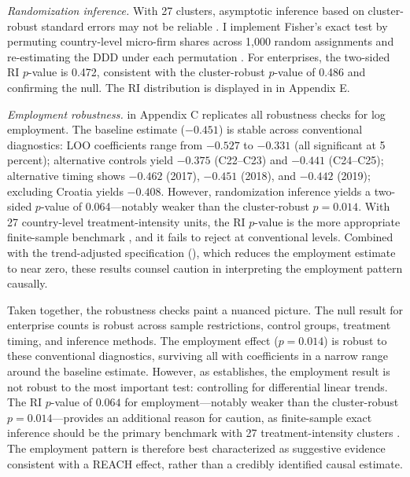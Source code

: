 \documentclass[12pt]{article}
\begin{document}
\textit{Randomization inference.} With 27 clusters, asymptotic inference based on cluster-robust standard errors may not be reliable \citep{bertrand2004, mackinnon2017wild}. I implement Fisher's exact test by permuting country-level micro-firm shares across 1,000 random assignments and re-estimating the DDD under each permutation \citep{fisher1935}. For enterprises, the two-sided RI $p$-value is 0.472, consistent with the cluster-robust $p$-value of 0.486 and confirming the null. The RI distribution is displayed in  in Appendix E.

\textit{Employment robustness.}  in Appendix C replicates all robustness checks for log employment. The baseline estimate ($-0.451$) is stable across conventional diagnostics: LOO coefficients range from $-0.527$ to $-0.331$ (all significant at 5 percent); alternative controls yield $-0.375$ (C22--C23) and $-0.441$ (C24--C25); alternative timing shows $-0.462$ (2017), $-0.451$ (2018), and $-0.442$ (2019); excluding Croatia yields $-0.408$. However, randomization inference yields a two-sided $p$-value of 0.064---notably weaker than the cluster-robust $p = 0.014$. With 27 country-level treatment-intensity units, the RI $p$-value is the more appropriate finite-sample benchmark \citep{fisher1935}, and it fails to reject at conventional levels. Combined with the trend-adjusted specification (), which reduces the employment estimate to near zero, these results counsel caution in interpreting the employment pattern causally.

Taken together, the robustness checks paint a nuanced picture. The null result for enterprise counts is robust across sample restrictions, control groups, treatment timing, and inference methods. The employment effect ($p = 0.014$) is robust to these conventional diagnostics, surviving all with coefficients in a narrow range around the baseline estimate. However, as  establishes, the employment result is not robust to the most important test: controlling for differential linear trends. The RI $p$-value of $0.064$ for employment---notably weaker than the cluster-robust $p = 0.014$---provides an additional reason for caution, as finite-sample exact inference should be the primary benchmark with 27 treatment-intensity clusters \citep{mackinnon2017wild}. The employment pattern is therefore best characterized as suggestive evidence consistent with a REACH effect, rather than a credibly identified causal estimate.


\end{document}
